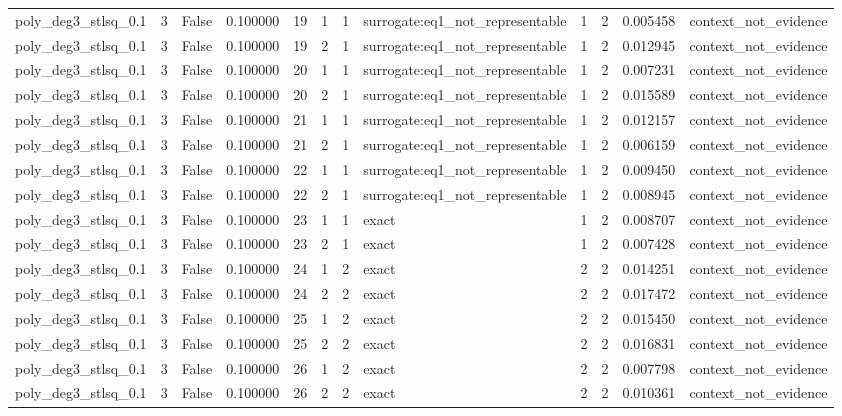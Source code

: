 \begin{tabular}{lrrrrrrlrrrl}
poly\_deg3\_stlsq\_0.1 & 3 & False & 0.100000 & 19 & 1 & 1 & surrogate:eq1\_not\_representable & 1 & 2 & 0.005458 & context\_not\_evidence \\
poly\_deg3\_stlsq\_0.1 & 3 & False & 0.100000 & 19 & 2 & 1 & surrogate:eq1\_not\_representable & 1 & 2 & 0.012945 & context\_not\_evidence \\
poly\_deg3\_stlsq\_0.1 & 3 & False & 0.100000 & 20 & 1 & 1 & surrogate:eq1\_not\_representable & 1 & 2 & 0.007231 & context\_not\_evidence \\
poly\_deg3\_stlsq\_0.1 & 3 & False & 0.100000 & 20 & 2 & 1 & surrogate:eq1\_not\_representable & 1 & 2 & 0.015589 & context\_not\_evidence \\
poly\_deg3\_stlsq\_0.1 & 3 & False & 0.100000 & 21 & 1 & 1 & surrogate:eq1\_not\_representable & 1 & 2 & 0.012157 & context\_not\_evidence \\
poly\_deg3\_stlsq\_0.1 & 3 & False & 0.100000 & 21 & 2 & 1 & surrogate:eq1\_not\_representable & 1 & 2 & 0.006159 & context\_not\_evidence \\
poly\_deg3\_stlsq\_0.1 & 3 & False & 0.100000 & 22 & 1 & 1 & surrogate:eq1\_not\_representable & 1 & 2 & 0.009450 & context\_not\_evidence \\
poly\_deg3\_stlsq\_0.1 & 3 & False & 0.100000 & 22 & 2 & 1 & surrogate:eq1\_not\_representable & 1 & 2 & 0.008945 & context\_not\_evidence \\
poly\_deg3\_stlsq\_0.1 & 3 & False & 0.100000 & 23 & 1 & 1 & exact & 1 & 2 & 0.008707 & context\_not\_evidence \\
poly\_deg3\_stlsq\_0.1 & 3 & False & 0.100000 & 23 & 2 & 1 & exact & 1 & 2 & 0.007428 & context\_not\_evidence \\
poly\_deg3\_stlsq\_0.1 & 3 & False & 0.100000 & 24 & 1 & 2 & exact & 2 & 2 & 0.014251 & context\_not\_evidence \\
poly\_deg3\_stlsq\_0.1 & 3 & False & 0.100000 & 24 & 2 & 2 & exact & 2 & 2 & 0.017472 & context\_not\_evidence \\
poly\_deg3\_stlsq\_0.1 & 3 & False & 0.100000 & 25 & 1 & 2 & exact & 2 & 2 & 0.015450 & context\_not\_evidence \\
poly\_deg3\_stlsq\_0.1 & 3 & False & 0.100000 & 25 & 2 & 2 & exact & 2 & 2 & 0.016831 & context\_not\_evidence \\
poly\_deg3\_stlsq\_0.1 & 3 & False & 0.100000 & 26 & 1 & 2 & exact & 2 & 2 & 0.007798 & context\_not\_evidence \\
poly\_deg3\_stlsq\_0.1 & 3 & False & 0.100000 & 26 & 2 & 2 & exact & 2 & 2 & 0.010361 & context\_not\_evidence \\

\end{tabular}
